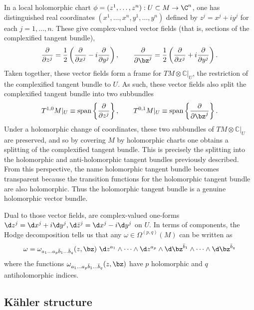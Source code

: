 \documentclass{worksheetclass}
\begin{document}
        In a local holomorphic chart $\phi=(z^1,\dots,z^n):U\subset M\to\C^n$, one has distinguished real coordinates $(x^{1},\dots ,x^{n},y^{1},\dots ,y^{n})$ defined by $z^j=x^j+iy^j$ for each $j=1,\dots,n$. These give complex-valued vector fields (that is, sections of the complexified tangent bundle),
        \begin{equation}
            \pdv{}{z^j}=\frac{1}{2}\left( \pdv{}{x^j}-i\pdv{}{y^j} \right),\qquad \pdv{}{\bz^j}=\frac{1}{2}\left( \pdv{}{x^j}+i\pdv{}{y^j} \right).
        \end{equation}
        Taken together, these vector fields form a frame for $TM\otimes \mathbb{C}|_U$, the restriction of the complexified tangent bundle to $U$. As such, these vector fields also split the complexified tangent bundle into two subbundles
        \begin{equation}
            T^{1,0}M|_U\equiv\text{span}\left\{\pdv{}{z^j}\right\},\qquad  T^{0,1}M|_U\equiv\text{span}\left\{\pdv{}{\bz^j}\right\}.
        \end{equation}
        Under a holomorphic change of coordinates, these two subbundles of $TM\otimes \mathbb{C}|_U$ are preserved, and so by covering $M$ by holomorphic charts one obtains a splitting of the complexified tangent bundle. This is precisely the splitting into the holomorphic and anti-holomorphic tangent bundles previously described. From this perspective, the name holomorphic tangent bundle becomes transparent because the transition functions for the holomorphic tangent bundle are also holomorphic. Thus the holomorphic tangent bundle is a genuine holomorphic vector bundle.

        Dual to those vector fields, are complex-valued one-forms $\d z^j=\d x^j+i\d y^j,\d\bar{z}^j=\d x^j-i\d y^j$ on $U$. In terms of components, the Hodge decomposition tells us that any $\omega\in\Omega^{(p,q)}(M)$ can be written as
        \begin{equation}
            \omega = \omega_{a_1\dots a_p\bar{b}_1\dots\bar{b}_q}(z,\bz)~\d z^{a_1}\wedge\dots\wedge \d z^{a_p}\wedge \d\bz^{\bar{b}_1}\wedge\dots\wedge \d\bz^{\bar{b}_q}
        \end{equation}
        where the functions $\omega_{a_1\dots a_p\bar{b}_1\dots\bar{b}_q}(z,\bz)$ have $p$ holomorphic and $q$ antiholomorphic indices. 
        
        

    \subsection{Kähler structure}
\end{document}
